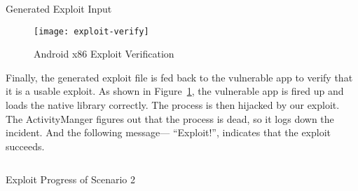 \inputminted[fontsize=\footnotesize]{c}{source/execve-log.c}

\begin{listing}[H]
  \singlespacing
  \inputminted[]{text}{source/exploit-input-80e9075}
  \caption{Generated Exploit Input}
  \label{lst:exploit-input}
  \onehalfspacing
\end{listing}

\begin{figure}[!ht]
  \texttt{[image: exploit-verify]}
  \caption{Android x86 Exploit Verification}
  \label{fig:exploit-verify}
\end{figure}

Finally, the generated exploit file is fed back to the vulnerable app to verify
that it is a usable exploit. As shown in Figure~\ref{fig:exploit-verify}, the
vulnerable app is fired up and loads the native library correctly. The process
is then hijacked by our exploit. The ActivityManger figures out that the
process is dead, so it logs down the incident. And the following message---
``Exploit!'', indicates that the exploit succeeds.

\begin{listing}[H]
  \singlespacing
  \inputminted[fontsize=\footnotesize, linenos]{text}{source/exploit-scenario2-progress}
  \caption{Exploit Progress of Scenario 2}
  \label{lst:exploit-scenario2-progress}
  \onehalfspacing
\end{listing}
